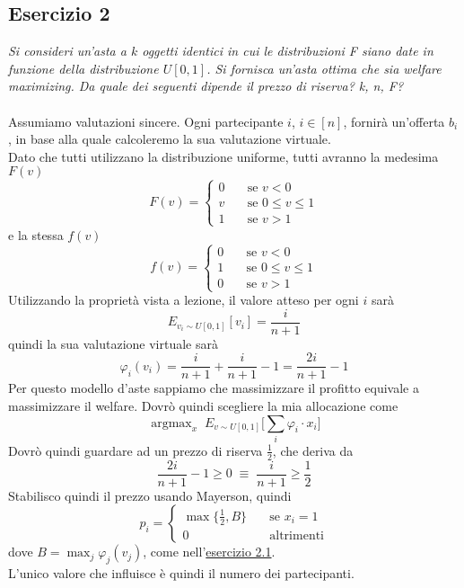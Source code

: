 \documentclass{article}
\DeclareMathOperator*{\argmax}{argmax}
\begin{document}
        \subsection{Esercizio 2}
            \textit{Si consideri un'asta a $ k $ oggetti identici in cui le distribuzioni F siano date in funzione della distribuzione $ U[0,1] $. Si fornisca un'asta ottima che sia welfare maximizing. Da quale dei seguenti dipende il prezzo di riserva? k, n, F?} \\
            \\
            Assumiamo valutazioni sincere. Ogni partecipante $ i $, $ i \in [n] $, fornirà un'offerta $ b_i $, in base alla quale calcoleremo la sua valutazione virtuale.\\
            Dato che tutti utilizzano la distribuzione uniforme, tutti avranno la medesima $ F(v) $
            \[
                F(v) = \begin{cases}
                    0\quad &\text{se } v < 0 \\
                    v\quad &\text{se } 0 \leq v \leq 1 \\
                    1\quad &\text{se } v > 1
                \end{cases}     
            \]
            e la stessa $ f(v) $
            \[
                f(v) = \begin{cases}
                    0\quad &\text{se } v < 0 \\
                    1\quad &\text{se } 0 \leq v \leq 1 \\
                    0\quad &\text{se } v > 1
                \end{cases}     
            \]
            Utilizzando la proprietà vista a lezione, il valore atteso per ogni $ i $ sarà
            \[
                E_{v_i \sim U[0,1]}[v_i] = \frac{i}{n + 1}    
            \]
            quindi la sua valutazione virtuale sarà
            \[
                \varphi_i(v_i) = \frac{i}{n + 1} + \frac{i}{n + 1} - 1 = \frac{2i}{n + 1} - 1
            \]
            Per questo modello d'aste sappiamo che massimizzare il profitto equivale a massimizzare il welfare. Dovrò quindi scegliere la mia allocazione come
            \[
                \argmax_x\; E_{v \sim U[0,1]} \Big[ \sum_i \varphi_i \cdot x_i \Big]   
            \]
            Dovrò quindi guardare ad un prezzo di riserva $ \frac{1}{2} $, che deriva da
            \[
                \frac{2i}{n + 1} - 1 \geq 0\; \equiv\; \frac{i}{n + 1} \geq \frac{1}{2} 
            \]
            Stabilisco quindi il prezzo usando Mayerson, quindi
            \[
                p_i = \begin{cases}
                    \max\{\frac{1}{2}, B\}\quad &\text{se } x_i = 1 \\
                    0\quad &\text{altrimenti}
                \end{cases}
            \]
            dove $ B = \max_j \varphi_j(v_j) $, come nell'\hyperref[e21]{esercizio 2.1}.\\
            L'unico valore che influisce è quindi il numero dei partecipanti.
        \newpage
\end{document}
